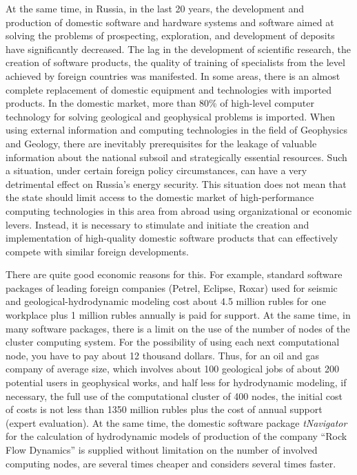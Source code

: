 \documentclass[12pt]{report}
\theoremstyle{definition}
\begin{document}
At the same time, in Russia, in the last 20 years, the development and production of domestic software and hardware systems and software aimed at solving the problems of prospecting, exploration, and development of deposits have significantly decreased.
The lag in the development of scientific research, the creation of software products, the quality of training of specialists from the level achieved by foreign countries was manifested.
In some areas, there is an almost complete replacement of domestic equipment and technologies with imported products.
In the domestic market, more than 80\% of high-level computer technology for solving geological and geophysical problems is imported.
When using external information and computing technologies in the field of Geophysics and Geology, there are inevitably prerequisites for the leakage of valuable information about the national subsoil and strategically essential resources.
Such a situation, under certain foreign policy circumstances, can have a very detrimental effect on Russia's energy security.
This situation does not mean that the state should limit access to the domestic market of high-performance computing technologies in this area from abroad using organizational or economic levers.
Instead, it is necessary to stimulate and initiate the creation and implementation of high-quality domestic software products that can effectively compete with similar foreign developments.

There are quite good economic reasons for this.
For example, standard software packages of leading foreign companies (Petrel, Eclipse, Roxar) used for seismic and geological-hydrodynamic modeling cost about 4.5 million rubles for one workplace plus  1 million rubles annually is paid for support.
At the same time, in many software packages, there is a limit on the use of the number of nodes of the cluster computing system.
For the possibility of using each next computational node, you have to pay about 12 thousand dollars.
Thus, for an oil and gas company of average size, which involves about 100 geological jobs of about 200 potential users in geophysical works, and half less for hydrodynamic modeling, if necessary, the full use of the computational cluster of 400 nodes, the initial cost of costs is not less than 1350 million rubles plus the cost of annual support (expert evaluation).
At the same time, the domestic software package \textit{tNavigator} for the calculation of hydrodynamic models of production of the company ``Rock Flow Dynamics'' is supplied without limitation on the number of involved computing nodes, are several times cheaper and considers several times faster.
\end{document}
